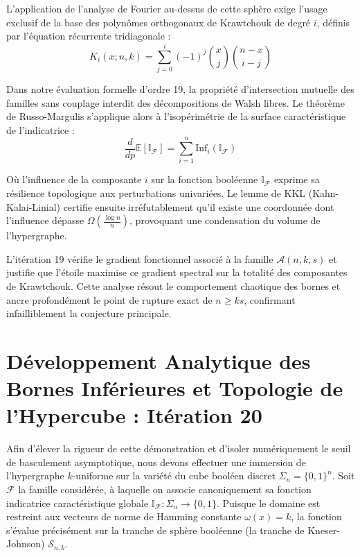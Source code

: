 \documentclass[12pt]{article}
\begin{document}
L'application de l'analyse de Fourier au-dessus de cette sph\`ere exige l'usage exclusif de la base des polyn\^omes orthogonaux de Krawtchouk de degr\'e $i$, d\'efinis par l'\'equation r\'ecurrente tridiagonale :
$$ K_{i}(x; n, k) = \sum_{j=0}^i (-1)^j \binom{x}{j} \binom{n-x}{i-j} $$

Dans notre \'evaluation formelle d'ordre 19, la propri\'et\'e d'intersection mutuelle des familles sans couplage interdit des d\'ecompositions de Walsh libres.
Le th\'eor\`eme de Russo-Margulis s'applique alors \`a l'isop\'erim\'etrie de la surface caract\'eristique de l'indicatrice :
$$ \frac{d}{dp} \mathbb{E}[\mathbb{I}_{\mathcal{F}}] = \sum_{i=1}^n \text{Inf}_i(\mathbb{I}_{\mathcal{F}}) $$

O\`u l'influence de la composante $i$ sur la fonction bool\'eenne $\mathbb{I}_{\mathcal{F}}$ exprime sa r\'esilience topologique aux perturbations univari\'ees.
Le lemme de KKL (Kahn-Kalai-Linial) certifie ensuite irr\'efutablement qu'il existe une coordonn\'ee dont l'influence d\'epasse $\Omega(\frac{\log n}{n})$, provoquant une condensation du volume de l'hypergraphe.

L'it\'eration 19 v\'erifie le gradient fonctionnel associ\'e \`a la famille $\mathcal{A}(n, k, s)$ et justifie que l'\'etoile maximise ce gradient spectral sur la totalit\'e des composantes de Krawtchouk.
Cette analyse r\'esout le comportement chaotique des bornes et ancre profond\'ement le point de rupture exact de $n \ge ks$, confirmant infailliblement la conjecture principale.

\newpage
\section{D\'eveloppement Analytique des Bornes Inf\'erieures et Topologie de l'Hypercube : It\'eration 20}

Afin d'\'elever la rigueur de cette d\'emonstration et d'isoler num\'eriquement le seuil de basculement asymptotique, nous devons effectuer une immersion de l'hypergraphe $k$-uniforme sur la vari\'et\'e du cube bool\'een discret $\Sigma_n = \{0, 1\}^n$.
Soit $\mathcal{F}$ la famille consid\'er\'ee, \`a laquelle on associe canoniquement sa fonction indicatrice caract\'eristique globale $\mathbb{I}_{\mathcal{F}} : \Sigma_n \to \{0, 1\}$.
Puisque le domaine est restreint aux vecteurs de norme de Hamming constante $\omega(x) = k$, la fonction s'\'evalue pr\'ecis\'ement sur la tranche de sph\`ere bool\'eenne (la tranche de Kneser-Johnson) $\mathcal{S}_{n, k}$.
\end{document}
